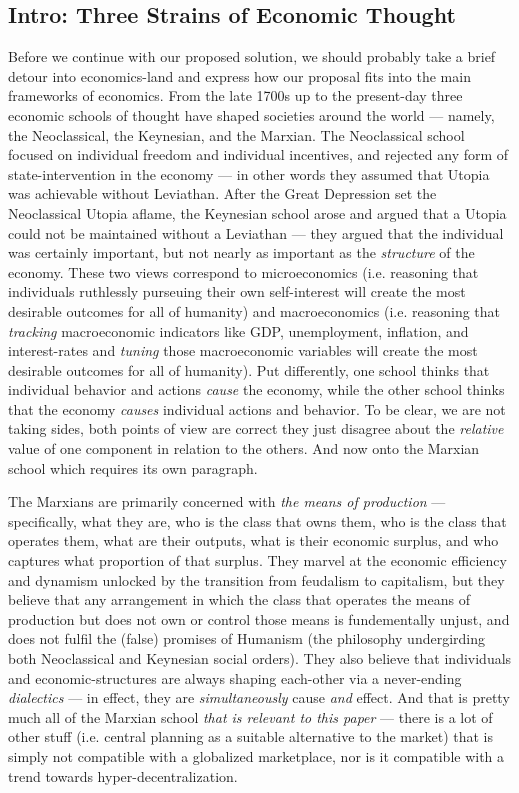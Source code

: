 \documentclass[a4paper]{article}
\begin{document}
\subsection{Intro: Three Strains of Economic Thought}
\label{Intro: Three Strains of Economic Thought}

Before we continue with our proposed solution, we should probably take a brief detour into economics-land and express how our proposal fits into the main frameworks of economics. From the late 1700s up to the present-day three economic schools of thought have shaped societies around the world ---  namely, the Neoclassical, the Keynesian, and the Marxian. The Neoclassical school focused on individual freedom and individual incentives, and rejected any form of state-intervention in the economy ---  in other words they assumed that Utopia was achievable without Leviathan. After the Great Depression set the Neoclassical Utopia aflame, the Keynesian school arose and argued that a Utopia could not be maintained without a Leviathan ---  they argued that the individual was certainly important, but not nearly as important as the \emph{structure} of the economy. These two views correspond to microeconomics (i.e. reasoning that individuals ruthlessly purseuing their own self-interest will create the most desirable outcomes for all of humanity) and macroeconomics (i.e. reasoning that \emph{tracking} macroeconomic indicators like GDP, unemployment, inflation, and interest-rates and \emph{tuning} those macroeconomic variables will create the most desirable outcomes for all of humanity). Put differently, one school thinks that individual behavior and actions \emph{cause} the economy, while the other school thinks that the economy \emph{causes} individual actions and behavior. To be clear, we are not taking sides, both points of view are correct they just disagree about the \emph{relative} value of one component in relation to the others. And now onto the Marxian school which requires its own paragraph.

The Marxians are primarily concerned with \emph{the means of production} ---  specifically, what they are, who is the class that owns them, who is the class that operates them, what are their outputs, what is their economic surplus, and who captures what proportion of that surplus. They marvel at the economic efficiency and dynamism unlocked by the transition from feudalism to capitalism, but they believe that any arrangement in which the class that operates the means of production but does not own or control those means is fundementally unjust, and does not fulfil the (false) promises of Humanism (the philosophy undergirding both Neoclassical and Keynesian social orders). They also believe that individuals and economic-structures are always shaping each-other via a never-ending \emph{dialectics} ---  in effect, they are \emph{simultaneously} cause \emph{and} effect. And that is pretty much all of the Marxian school \emph{that is relevant to this paper} ---  there is a lot of other stuff (i.e. central planning as a suitable alternative to the market) that is simply not compatible with a globalized marketplace, nor is it compatible with a trend towards hyper-decentralization.
\end{document}
